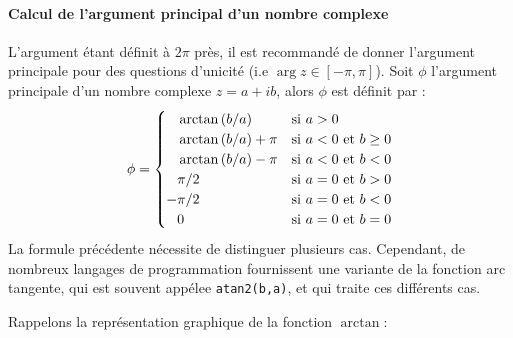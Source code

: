 \paragraph{Calcul de l'argument principal d'un nombre complexe}
L'argument étant définit à $2\pi$ près, il est recommandé de donner l'argument principale 
pour des questions d'unicité (i.e $\arg{z}\in[-\pi,\pi]$). 
Soit $\phi$ l'argument principale d'un nombre complexe $z=a+ib$, alors $\phi$ est définit par :
$$
\phi=
\begin{cases}
    \hphantom{-}\arctan{(b/a)}     & \text{si $a>0$} \\
    \hphantom{-}\arctan{(b/a)}+\pi & \text{si $a<0$ et $b\ge0$} \\
    \hphantom{-}\arctan{(b/a)}-\pi & \text{si $a<0$ et $b<0$} \\
    \hphantom{-} \pi/2             & \text{si $a=0$ et $b>0$} \\
                -\pi/2             & \text{si $a=0$ et $b<0$} \\
    \hphantom{-}0                  & \text{si $a=0$ et $b=0$} \\
\end{cases}
$$
La formule précédente nécessite de distinguer plusieurs cas.
Cependant, de nombreux langages de programmation fournissent
une variante de la fonction arc tangente, qui est souvent appélee
\verb?atan2(b,a)?, et qui traite ces différents cas. 

Rappelons la représentation graphique de la fonction $\arctan$:

